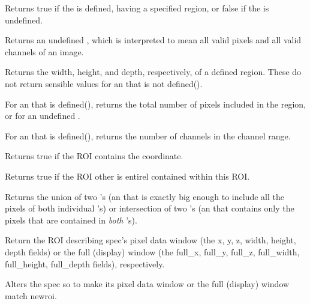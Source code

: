 Returns {\cf true} if the \ROI is defined, having a specified region,
or {\cf false} if the \ROI is undefined.
\apiend

Returns an undefined \ROI, which is interpreted to mean all valid pixels
and all valid channels of an image.
\apiend

Returns the width, height, and depth, respectively, of a defined region.
These do not return sensible values for an \ROI that is not {\cf defined()}.
\apiend

For an \ROI that is {\cf defined()}, returns the total number of pixels
included in the region, or {} for an undefined \ROI.
\apiend

For an \ROI that is {\cf defined()}, returns the number of channels
in the channel range.
\apiend

Returns {\cf true} if the ROI contains the coordinate.
\apiend

Returns {\cf true} if the ROI {\cf other} is entirel contained within
this ROI.
\apiend

Returns the union of two \ROI's (an \ROI that is exactly big enough
to include all the pixels of both individual \ROI's) or intersection
of two \ROI's (an \ROI that contains only the pixels that are contained
in \emph{both} \ROI's).
\apiend

Return the ROI describing {\cf spec}'s pixel data window (the {\cf x, y, z,
width, height, depth} fields)
or the full (display) window (the {\cf full_x, full_y, full_z,
full_width, full_height, full_depth} fields), respectively.
\apiend

Alters the {\cf spec} so to make its pixel data window 
or the full (display) window match {\cf newroi}.
\apiend


